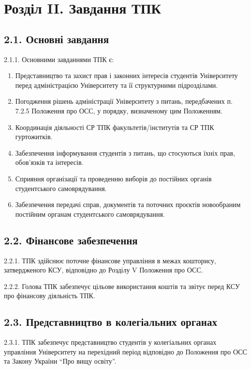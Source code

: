 \section*{Розділ II. Завдання ТПК}

\subsection*{2.1. Основні завдання}
    2.1.1. Основними завданнями ТПК є:

        \begin{enumerate}[label=\alph*)]
            \item Представництво та захист прав і законних інтересів студентів Університету перед адміністрацією Університету та її структурними підрозділами.
            \item Погодження рішень адміністрації Університету з питань, передбачених п. 7.2.5 Положення про ОСС, у порядку, визначеному цим Положенням.
            \item Координація діяльності СР ТПК факультетів/інститутів та СР ТПК гуртожитків.
            \item Забезпечення інформування студентів з питань, що стосуються їхніх прав, обов'язків та інтересів.
            \item Сприяння організації та проведенню виборів до постійних органів студентського самоврядування.
            \item Забезпечення передачі справ, документів та поточних проєктів новообраним постійним органам студентського самоврядування.
        \end{enumerate}

\subsection*{2.2. Фінансове забезпечення}
    2.2.1. ТПК здійснює поточне фінансове управління в межах кошторису, затвердженого КСУ, відповідно до Розділу V Положення про ОСС.

    2.2.2. Голова ТПК забезпечує цільове використання коштів та звітує перед КСУ про фінансову діяльність ТПК.

\subsection*{2.3. Представництво в колегіальних органах}
    2.3.1. ТПК забезпечує представництво студентів у колегіальних органах управління Університету на перехідний період відповідно до Положення про ОСС та Закону України ``Про вищу освіту''.
